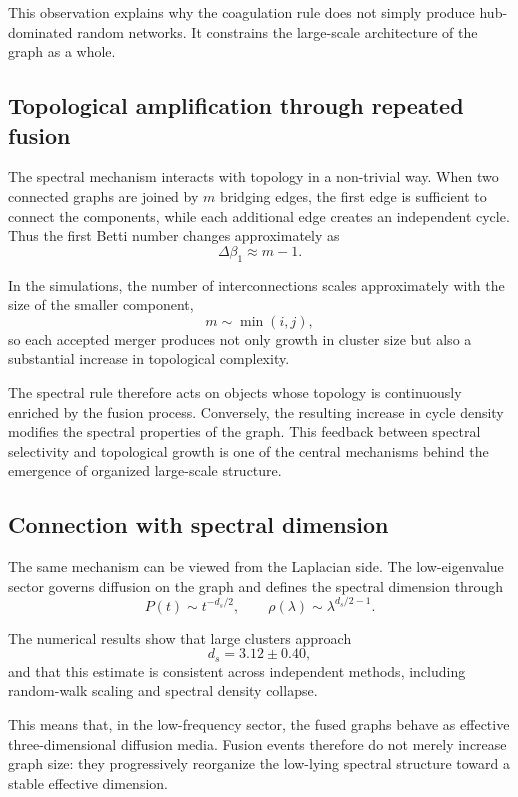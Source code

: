 \documentclass[11pt]{article}
\begin{document}
This observation explains why the coagulation rule does not simply produce hub-dominated random networks.
It constrains the large-scale architecture of the graph as a whole.

\subsection{Topological amplification through repeated fusion}

The spectral mechanism interacts with topology in a non-trivial way.
When two connected graphs are joined by $m$ bridging edges, the first edge is sufficient to connect the components, while each additional edge creates an independent cycle.
Thus the first Betti number changes approximately as
\[
\Delta\beta_1 \approx m-1.
\]

In the simulations, the number of interconnections scales approximately with the size of the smaller component,
\[
m \sim \min(i,j),
\]
so each accepted merger produces not only growth in cluster size but also a substantial increase in topological complexity.

The spectral rule therefore acts on objects whose topology is continuously enriched by the fusion process.
Conversely, the resulting increase in cycle density modifies the spectral properties of the graph.
This feedback between spectral selectivity and topological growth is one of the central mechanisms behind the emergence of organized large-scale structure.

\subsection{Connection with spectral dimension}

The same mechanism can be viewed from the Laplacian side.
The low-eigenvalue sector governs diffusion on the graph and defines the spectral dimension through
\[
P(t)\sim t^{-d_s/2},
\qquad
\rho(\lambda)\sim \lambda^{d_s/2-1}.
\]

The numerical results show that large clusters approach
\[
d_s = 3.12 \pm 0.40,
\]
and that this estimate is consistent across independent methods, including random-walk scaling and spectral density collapse.

This means that, in the low-frequency sector, the fused graphs behave as effective three-dimensional diffusion media.
Fusion events therefore do not merely increase graph size:
they progressively reorganize the low-lying spectral structure toward a stable effective dimension.
\end{document}
